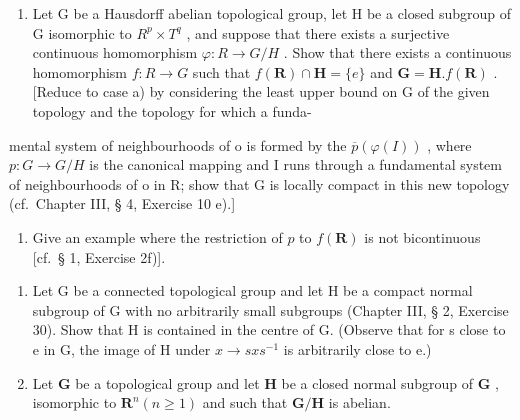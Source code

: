 \begin{enumerate}
\def\labelenumi{\alph{enumi})}
\setcounter{enumi}{1}
\tightlist
\item
  Let G be a Hausdorff abelian topological group, let H be a closed subgroup of G isomorphic to \(R^{p} \times T^{q}\) , and suppose that there exists a surjective continuous homomorphism \(\varphi: R \to G/H\) . Show that there exists a continuous homomorphism \(f: R \to G\) such that \(f(\mathbf{R}) \cap \mathbf{H} = \{e\}\) and \(\mathbf{G} = \mathbf{H}. f(\mathbf{R})\) . {[}Reduce to case a) by considering the least upper bound on G of the given topology and the topology for which a funda-
\end{enumerate}

mental system of neighbourhoods of o is formed by the \(\overline{p}(\varphi(I))\) , where \(p:G\to G/H\) is the canonical mapping and I runs through a fundamental system of neighbourhoods of o in R; show that G is locally compact in this new topology (cf.~Chapter III, § 4, Exercise 10 e).{]}

\begin{enumerate}
\def\labelenumi{\alph{enumi})}
\setcounter{enumi}{2}
\tightlist
\item
  Give an example where the restriction of \(p\) to \(f(\mathbf{R})\) is not bicontinuous {[}cf.~§ 1, Exercise 2f){]}.
\end{enumerate}

\begin{enumerate}
\def\labelenumi{\arabic{enumi})}
\setcounter{enumi}{4}
\item
  Let G be a connected topological group and let H be a compact normal subgroup of G with no arbitrarily small subgroups (Chapter III, § 2, Exercise 30). Show that H is contained in the centre of G. (Observe that for s close to e in G, the image of H under \(x \rightarrow sxs^{-1}\) is arbitrarily close to e.)
\item
  Let \(\mathbf{G}\) be a topological group and let \(\mathbf{H}\) be a closed normal subgroup of \(\mathbf{G}\) , isomorphic to \(\mathbf{R}^n (n\geqslant 1)\) and such that \(\mathbf{G} / \mathbf{H}\) is abelian.
\end{enumerate}

